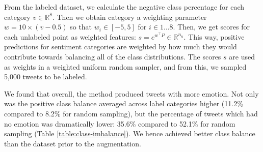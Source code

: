 \documentclass[letterpaper]{article} %
\begin{document}
From the labeled dataset, we calculate the negative class percentage for each category $v \in \mathbb{R}^{8}$. Then we obtain category a weighting parameter $w = 10 \times (v - 0.5)$ so that $w_i \in [-5, 5]$ for $i \in 1\ldots8.$ Then, we get scores for each unlabeled point as weighted features: $s = e^{w^{\top}P} \in \mathbb{R}^{n_u}$. This way, positive predictions for sentiment categories are weighted by how much they would contribute towards balancing all of the class distributions. The scores $s$ are used as weights in a weighted uniform random sampler, and from this, we sampled 5,000 tweets to be labeled.

We found that overall, the method produced tweets with more emotion. Not only was the positive class balance averaged across label categories higher (11.2\% compared to 8.2\% for random sampling),  but the percentage of tweets which had no emotion was dramatically lower: 35.6\% compared to 52.1\% for random sampling (Table \ref{table:class-imbalance}). We hence achieved better class balance than the dataset prior to the augmentation.

\begin{table}[!htpb]
\centering
\caption{Binary sentiment accuracy. The SST dataset includes Positive and Negative labels. Other datasets include Neutral labels. Third party results (Watson and Google) thresholded on the test set. }
\label{table:binary-results}
\end{table}
\end{document}
